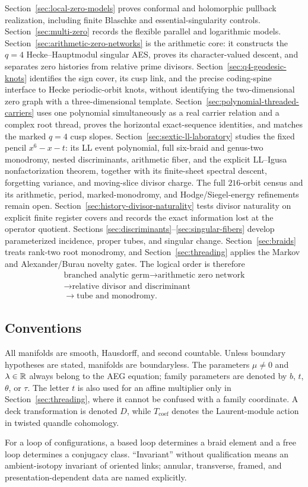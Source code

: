 Section~\ref{sec:local-zero-models} proves conformal and holomorphic pullback
realization, including finite Blaschke and essential-singularity controls.
Section~\ref{sec:multi-zero} records the flexible parallel and logarithmic models.
Section~\ref{sec:arithmetic-zero-networks} is the arithmetic core: it constructs
the $q=4$ Hecke--Hauptmodul singular AES, proves its character-valued descent, and
separates zero histories from relative prime divisors.
Section~\ref{sec:q4-geodesic-knots} identifies the sign cover, its cusp link,
and the precise coding-spine interface to Hecke periodic-orbit knots, without
identifying the two-dimensional zero graph with a three-dimensional template.
Section~\ref{sec:polynomial-threaded-carriers} uses one polynomial simultaneously
as a real carrier relation and a complex root thread, proves the horizontal
exact-sequence identities, and matches the marked $q=4$ cusp slopes.
Section~\ref{sec:sextic-ll-laboratory} studies the fixed pencil
$x^6-x-t$: its LL event polynomial, full six-braid and genus-two monodromy,
nested discriminants, arithmetic fiber, and the explicit LL--Igusa
nonfactorization theorem, together with its finite-sheet spectral descent,
forgetting variance, and moving-slice divisor charge.  The full $216$-orbit
census and its arithmetic, period, marked-monodromy, and Hodge/Siegel-energy
refinements remain open.
Section~\ref{sec:history-divisor-naturality} tests divisor naturality on explicit
finite register covers and records the exact information lost at the operator
quotient.  Sections
\ref{sec:discriminants}--\ref{sec:singular-fibers} develop parameterized incidence,
proper tubes, and singular change.  Section~\ref{sec:braids} treats rank-two root
monodromy, and Section~\ref{sec:threading} applies the Markov and Alexander/Burau
novelty gates.  The logical order is therefore
\[
 \begin{gathered}
 \text{branched analytic germ}
 \longrightarrow\text{arithmetic zero network}\\
 \longrightarrow\text{relative divisor and discriminant}\\
 \longrightarrow\text{tube and monodromy}.
 \end{gathered}
\]

\subsection{Conventions}

All manifolds are smooth, Hausdorff, and second countable.  Unless boundary
hypotheses are stated, manifolds are boundaryless.  The parameters $\mu\ne0$ and
$\lambda\in\mathbb{R}$ always belong to the AEG equation; family parameters are denoted by
$b$, $t$, $\theta$, or $\tau$.  The letter $t$ is also used for an affine
multiplier only in Section~\ref{sec:threading}, where it cannot be confused with a
family coordinate.  A deck transformation is denoted $D$, while $T_{\mathrm{coef}}$
denotes the Laurent-module action in twisted quandle cohomology.

For a loop of configurations, a based loop determines a braid element and a free
loop determines a conjugacy class.  ``Invariant'' without qualification means an
ambient-isotopy invariant of oriented links; annular, transverse, framed, and
presentation-dependent data are named explicitly.
